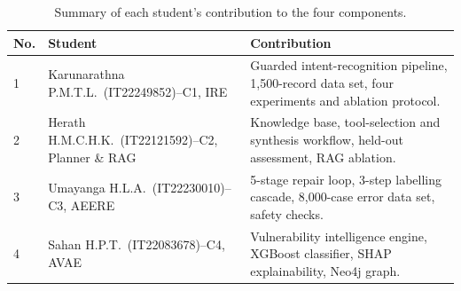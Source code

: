 \begin{table}[htbp]
  \centering
  \begin{tabular}{@{}p{}p{}p{}@{}}
    \toprule
    \textbf{No.} & \textbf{Student} & \textbf{Contribution}\\
    \midrule
    1 & Karunarathna P.M.T.L.\ (IT22249852)\quad--\quad C1, IRE & Guarded
    intent-recognition pipeline, 1,500-record data set, four experiments and
    ablation protocol.\\
    2 & Herath H.M.C.H.K.\ (IT22121592)\quad--\quad C2, Planner \& RAG & Knowledge
    base, tool-selection and synthesis workflow, held-out assessment, RAG
    ablation.\\
    3 & Umayanga H.L.A.\ (IT22230010)\quad--\quad C3, AEERE & 5-stage repair loop,
    3-step labelling cascade, 8,000-case error data set, safety checks.\\
    4 & Sahan H.P.T.\ (IT22083678)\quad--\quad C4, AVAE & Vulnerability
    intelligence engine, XGBoost classifier, SHAP explainability, Neo4j graph.\\
    \bottomrule
  \end{tabular}
  \caption{Summary of each student's contribution to the four components.}\label{tab:contributions}
\end{table}